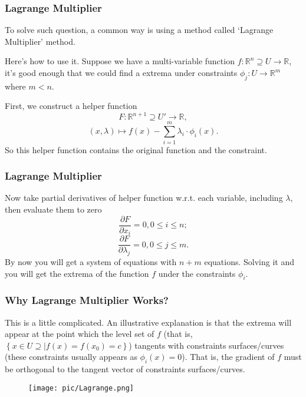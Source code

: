 \documentclass[compress]{beamer}
\begin{document}
\begin{frame}
  \frametitle{Lagrange Multiplier}
  To solve such question, a common way is using a method called `Lagrange Multiplier' method.

  Here's how to use it. Suppose we have a multi-variable function \(f : \mathbb{R}^n \supseteq U \to \mathbb{R}\), it's good enough that we could find
  a extrema under constraints \(\phi_j : U \to \mathbb{R}^m\) where \(m<n\).

  First, we construct a helper function
  \[F : \mathbb{R}^{n+1}\supseteq U' \to \mathbb{R},\]
  \[(x,\lambda) \mapsto f(x) - \sum_{i=1}^m \lambda_i \cdot \phi_i(x). \]
  So this helper function contains the original function and the constraint.
\end{frame}

\begin{frame}
  \frametitle{Lagrange Multiplier}
  Now take partial derivatives of helper function w.r.t. each variable, including \(\lambda\), then evaluate them to zero
  \[\frac{\partial F}{\partial x_i} = 0, 0\leq i \leq n;\]
  \[\frac{\partial F}{\partial\lambda_j} = 0, 0 \leq j \leq m.\]
  By now you will get a system of equations with \(n+m\) equations. Solving it and you will get the extrema of the function \(f\)
  under the constraints \(\phi_i\).
\end{frame}

\begin{frame}
  \frametitle{Why Lagrange Multiplier Works?}
  This is a little complicated. An illustrative explanation is that the extrema will appear
  at the point which the level set of \(f\) (that is, \(\left\{ x \in U \supseteq \Big| f(x) = f(x_0) = c \right\}\))
  tangents with constraints surfaces/curves (these constraints usually appears as \(\phi_i(x) = 0\)). That is, the gradient
  of \(f\) must be orthogonal to the tangent vector of constraints surfaces/curves.

  \begin{figure}[!h]
    \centering
    \texttt{[image: pic/Lagrange.png]}
  \end{figure}

\end{frame}
\end{document}
